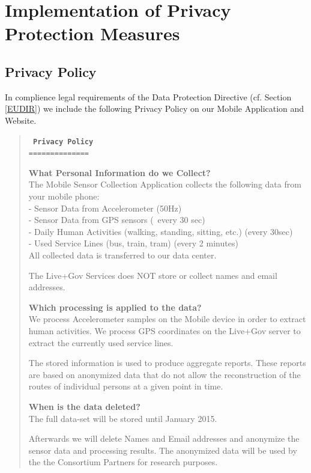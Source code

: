 \chapter{Implementation of Privacy Protection Measures}
\section{Privacy Policy} \label{sec:PP}

In complience legal requirements of the Data Protection Directive (cf. Section \ref{EUDIR}) we include the following
Privacy Policy on our Mobile Application and Website.

\begin{quote}
\tt \small
\textbf{Privacy Policy}\\
==============

\textbf{What Personal Information do we Collect?}\\
The Mobile Sensor Collection Application collects the following data from your mobile phone:\\
- Sensor Data from Accelerometer (50Hz)\\
- Sensor Data from GPS sensors (~every 30 sec)\\
- Daily Human Activities (walking, standing, sitting, etc.) (every 30sec)\\
- Used Service Lines (bus, train, tram) (every 2 minutes)\\

All collected data is transferred to our data center.

The Live+Gov Services does NOT store or collect names and email addresses.

\textbf{Which processing is applied to the data?}\\
We process Accelerometer samples on the Mobile device in order to extract human activities.
We process GPS coordinates on the Live+Gov server to extract the currently used service lines.

The stored information is used to produce aggregate reports.
These reports are based on anonymized data that do not allow the reconstruction of the routes of individual persons at a given point in time.

\textbf{When is the data deleted?}\\
The full data-set will be stored until January 2015.

Afterwards we will delete Names and Email addresses and anonymize
the sensor data and processing results.  The anonymized data will
be used by the the Consortium Partners for research purposes.


\end{quote}
